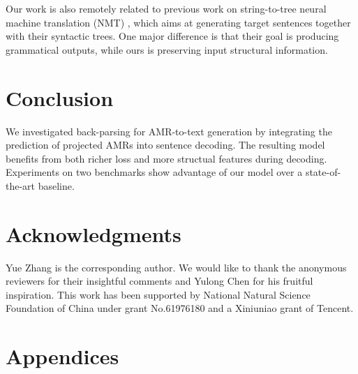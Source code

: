 \documentclass[11pt,a4paper]{article}
\begin{document}
Our work is also remotely related to previous work on string-to-tree neural machine translation (NMT) \citep{aharoni2017towards,wu2017sequence,wang2018tree}, which aims at generating target sentences together with their syntactic trees.
One major difference is that their goal is producing grammatical outputs, while ours is preserving input structural information.


\section{Conclusion}

We investigated back-parsing for AMR-to-text generation by integrating the prediction of projected AMRs into sentence decoding.
The resulting model benefits from both richer loss and more structual features during decoding.
Experiments on two benchmarks show advantage of our model over a state-of-the-art baseline.
\section*{Acknowledgments}
Yue Zhang is the corresponding author.
We would like to thank the anonymous reviewers for their insightful comments and Yulong Chen for his fruitful inspiration.
This work has been supported by National Natural Science Foundation of China under grant No.61976180 and a Xiniuniao grant of Tencent.





\clearpage
\appendix
\section{Appendices}
\end{document}
